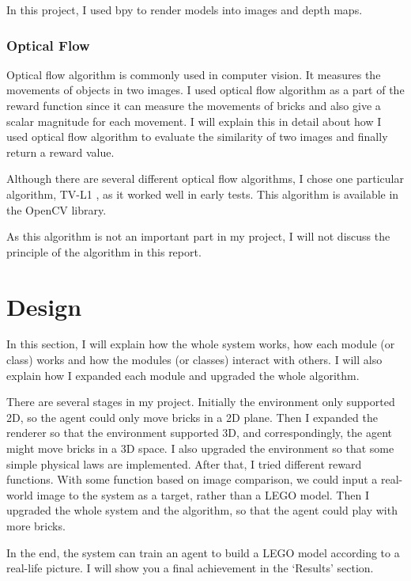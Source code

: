 \documentclass[a4paper]{article}
\begin{document}
                In this project, I used bpy to render models into images and depth maps.
            
            \subsubsection{Optical Flow}
                Optical flow algorithm is commonly used in computer vision. It measures the movements of objects in two images. I used optical flow algorithm as a part of the reward function since it can measure the movements of bricks and also give a scalar magnitude for each movement. I will explain this in detail about how I used optical flow algorithm to evaluate the similarity of two images and finally return a reward value.
                
                Although there are several different optical flow algorithms, I chose one particular algorithm, TV-L1 \cite{tvl1}, as it worked well in early tests. This algorithm is available in the OpenCV library.
                
                As this algorithm is not an important part in my project, I will not discuss the principle of the algorithm in this report.
            
    \section{Design}
    
        In this section, I will explain how the whole system works, how each module (or class) works and how the modules (or classes) interact with others. I will also explain how I expanded each module and upgraded the whole algorithm. 
        
        There are several stages in my project. 
        Initially the environment only supported 2D, so the agent could only move bricks in a 2D plane. Then I expanded the renderer so that the environment supported 3D, and correspondingly, the agent might move bricks in a 3D space. I also upgraded the environment so that some simple physical laws are implemented. After that, I tried different reward functions. With some function based on image comparison, we could input a real-world image to the system as a target, rather than a LEGO model. Then I upgraded the whole system and the algorithm, so that the agent could play with more bricks.
               
        In the end, the system can train an agent to build a LEGO model according to a real-life picture. I will show you a final achievement in the `Results' section.
    
\end{document}
